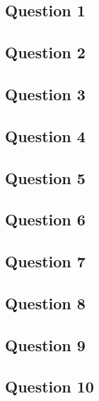 
\subsection{Question 1}


\subsection*{Question 2}


\subsection*{Question 3}


\subsection*{Question 4}


\subsection*{Question 5}


\subsection*{Question 6}


\subsection*{Question 7}


\subsection*{Question 8}


\subsection*{Question 9}


\subsection*{Question 10}

